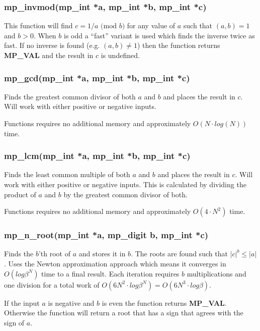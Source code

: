 \documentclass[]{article}
\begin{document}
\subsubsection{mp\_invmod(mp\_int *a, mp\_int *b, mp\_int *c)}
This function will find $c = 1/a \mbox{ (mod }b\mbox{)}$ for any value of $a$ such that $(a, b) = 1$ and $b > 0$.  When
$b$ is odd a ``fast'' variant is used which finds the inverse twice as fast.  If no inverse is found (e.g. $(a, b) \ne 1$) then
the function returns \textbf{MP\_VAL} and the result in $c$ is undefined.

\subsubsection{mp\_gcd(mp\_int *a, mp\_int *b, mp\_int *c)}
Finds the greatest common divisor of both $a$ and $b$ and places the result in $c$.  Will work with either positive
or negative inputs.  

Functions requires no additional memory and approximately $O(N \cdot log(N))$ time.

\subsubsection{mp\_lcm(mp\_int *a, mp\_int *b, mp\_int *c)}
Finds the least common multiple of both $a$ and $b$ and places the result in $c$.  Will work with either positive
or negative inputs.  This is calculated by dividing the product of $a$ and $b$ by the greatest common divisor of 
both.  

Functions requires no additional memory and approximately $O(4 \cdot N^2)$ time.

\subsubsection{mp\_n\_root(mp\_int *a, mp\_digit b, mp\_int *c)}
Finds the $b$'th root of $a$ and stores it in $b$.  The roots are found such that $\vert c \vert^b \le \vert a \vert$.  
Uses the Newton approximation approach which means it converges in $O(log \beta^N)$ time to a final result.  Each iteration
requires $b$ multiplications and one division for a total work of $O(6N^2 \cdot log \beta^N) = O(6N^3 \cdot log \beta)$.

If the input $a$ is negative and $b$ is even the function returns \textbf{MP\_VAL}.  Otherwise the function will 
return a root that has a sign that agrees with the sign of $a$.
\end{document}
